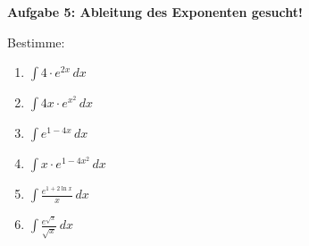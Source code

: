 \documentclass[a4paper,12pt]{article}
\newcommand{\Aufgabe}[1]{
  {
  \vspace*{0.5cm}
  \textsf{\textbf{Aufgabe #1}}
  \vspace*{0.2cm}
  
  }
}
\begin{document}
\Aufgabe{5: Ableitung des Exponenten gesucht!}
Bestimme:
\begin{enumerate}[label={\alph*)}, topsep=5pt,itemsep=4ex,partopsep=1ex,parsep=1ex]
  \item $\int 4\cdot e^{2x}\,dx$
  \item $\int 4x\cdot e^{x^2}\,dx$
  \item $\int e^{1-4x}\,dx$
  \item $\int x\cdot e^{1-4x^2}\,dx$
  \item $\int \frac{e^{1+2\ln{x}}}{x}\,dx$
  \item $\int \frac{e^{\sqrt{x}}}{\sqrt{x}}\,dx$
\end{enumerate}

\end{document}
